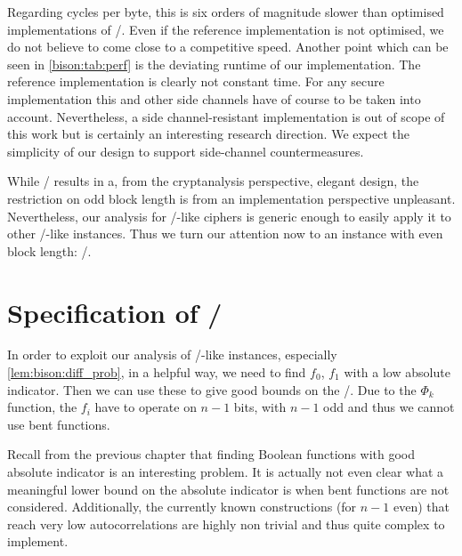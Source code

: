 Regarding cycles per byte, this is six orders of magnitude slower than optimised implementations of \AES/\@.
Even if the reference implementation is not optimised, we do not believe to come close to a competitive speed.
Another point which can be seen in \cref{bison:tab:perf} is the deviating runtime of our implementation.
The reference implementation is clearly not constant time. %
For any secure implementation this and other side channels have of course to be taken into account.
Nevertheless, a side channel-resistant implementation is out of scope of this work but is certainly an interesting research direction.
We expect the simplicity of our design to support side-channel countermeasures.

While \bison/ results in a, from the cryptanalysis perspective, elegant design, the restriction on odd block length is from an implementation perspective unpleasant.
Nevertheless, our analysis for \bison/-like ciphers is generic enough to easily apply it to other \bison/-like instances.
Thus we turn our attention now to an instance with even block length: \wisent/.

\section{Specification of \wisent/}\label{sec:wisent:instance}

In order to exploit our analysis of \bison/-like instances, especially \cref{lem:bison:diff_prob}, in a helpful way, we need to find $f_0$, $f_1$ with a low absolute indicator.
Then we can use these to give good bounds on the \EDP/.
Due to the $\Phi_k$ function, the $f_i$ have to operate on $n-1$ bits, with $n-1$ odd and thus we cannot use bent functions.

Recall from the previous chapter that finding Boolean functions with good absolute indicator is an interesting problem.
It is actually not even clear what a meaningful lower bound on the absolute indicator is when bent functions are not considered.
Additionally, the currently known constructions (for $n-1$ even) that reach very low autocorrelations are highly non trivial and thus quite complex to implement.

